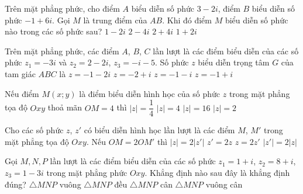 \begin{ex}%
	Trên mặt phẳng phức, cho điểm $A$ biểu diễn số phức $3-2i$, điểm $B$ biểu diễn số phức $-1 + 6i$. Gọi $M$ là trung điểm của $AB$. Khi đó điểm $M$ biểu diễn số phức nào trong các số phức sau?
	\choice
	{$1-2i$}
	{$2-4i$}
	{$2+4i$}
	{\True $1+2i$}
\end{ex}

\begin{ex}%
	Trên mặt phẳng phức, các điểm $A$, $B$, $C$ lần lượt là các điểm biểu diễn của các số phức $z_1 = -3i$ và $z_2 = 2-2i$, $z_3=-i-5$. Số phức $z$ biểu diễn trọng tâm $G$ của tam giác $ABC$ là
	\choice
	{\True $z = -1 -2i$}
	{$z = -2 +i$}
	{$z = -1 -i$}
	{$z = -1 +i$}
\end{ex}

\begin{ex}%
	Nếu điểm $M(x;y)$ là điểm biểu diễn hình học của số phức $z$ trong mặt phẳng tọa độ $Oxy$ thoả mãn $OM=4$ thì
	\choice
	{$|z|=\dfrac{1}{4}$}
	{\True $|z|=4$}
	{$|z|=16$}
	{$|z|=2$}
\end{ex}

\begin{ex}%
	Cho các số phức $z$, $z'$ có biểu diễn hình học lần lượt là các điểm $M$, $M'$ trong mặt phẳng tọa độ $Oxy$. Nếu $OM=2OM'$ thì
	\choice
	{\True $|z|=2|z'|$}
	{$z'=2z$}
	{$z=2z'$}
	{$|z'|=2|z|$}
\end{ex}

\begin{ex}%
	Gọi $ M, N, P $ lần lượt là các điểm biểu diễn của các số phức $ z_1=1+i $, $ z_2=8+i $, $ z_3=1-3i $ trong mặt phẳng phức $ Oxy $. Khẳng định nào sau đây là khẳng định đúng?
	\choice
	{\True $ \triangle MNP $ vuông}
	{$ \triangle MNP $ đều}
	{$ \triangle MNP $ cân}
	{$ \triangle MNP $ vuông cân}
\end{ex}

